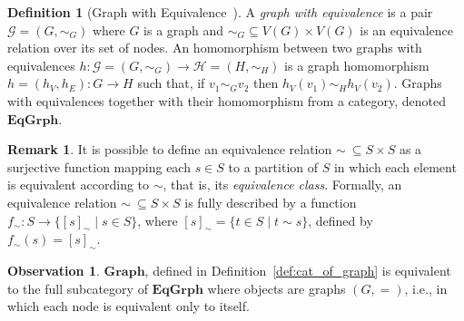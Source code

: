 \documentclass[a4paper, twoside,openright]{report}
\theoremstyle{plain}
\theoremstyle{definition}
\newtheorem{definition}[theorem]{Definition}
\newtheorem{remark}[theorem]{Remark}
\newtheorem{obs}[theorem]{Observation}
\begin{document}
\begin{definition}[Graph with Equivalence~\cite{concur2006}]
    A \emph{graph with equivalence} is a pair $\mathcal{G} = (G, \sim_G)$ where $G$ is a graph and $\sim_G \subseteq V(G)\times V(G)$ is an equivalence relation over its set of nodes. An homomorphism between two graphs with equivalences $h :\mathcal{G} = (G, \sim_G)\rightarrow \mathcal{H} = (H, \sim_H)$ is a graph homomorphism $h = (h_V, h_E):G \rightarrow H$ such that, if $v_1 \sim_G v_2$ then $h_V(v_1) \sim_H h_V(v_2)$. Graphs with equivalences together with their homomorphism from a category, denoted $\mathbf{EqGrph}$.
\end{definition}

\begin{remark}\label{rem:eq_as_surj}
    It is possible to define an equivalence relation $\sim \ \subseteq S\times S$ as a surjective function mapping each $s \in S$ to a partition of $S$ in which each element is equivalent according to $\sim$, that is, its \emph{equivalence class}. Formally, an equivalence relation $\sim \ \subseteq S\times S$ is fully described by a function $f_\sim : S \rightarrow \{[s]_\sim \mid s \in S \}$, where $[s]_\sim = \{t \in S \mid t \sim s\}$, defined by $f_{\sim}(s) = [s]_\sim$. 
\end{remark}

\begin{obs}
    $\mathbf{Graph}$, defined in Definition~\ref{def:cat_of_graph} is equivalent to the full subcategory of $\mathbf{EqGrph}$ where objects are graphs $(G, =)$, i.e., in which each node is equivalent only to itself.
\end{obs}


\end{document}
